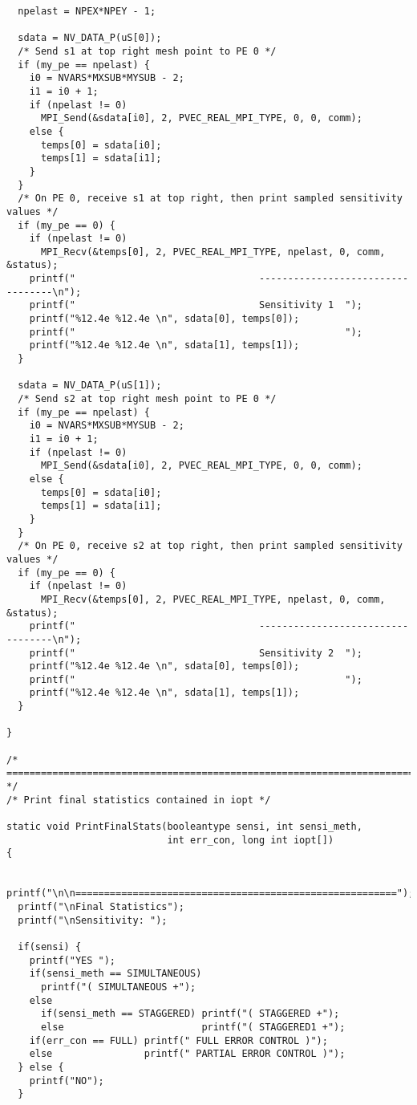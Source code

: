 \begin{verbatim}
  npelast = NPEX*NPEY - 1;

  sdata = NV_DATA_P(uS[0]);
  /* Send s1 at top right mesh point to PE 0 */
  if (my_pe == npelast) {
    i0 = NVARS*MXSUB*MYSUB - 2;
    i1 = i0 + 1;
    if (npelast != 0)
      MPI_Send(&sdata[i0], 2, PVEC_REAL_MPI_TYPE, 0, 0, comm);
    else {
      temps[0] = sdata[i0];
      temps[1] = sdata[i1];
    }
  }
  /* On PE 0, receive s1 at top right, then print sampled sensitivity values */ 
  if (my_pe == 0) {
    if (npelast != 0)
      MPI_Recv(&temps[0], 2, PVEC_REAL_MPI_TYPE, npelast, 0, comm, &status);
    printf("                                ----------------------------------\n");
    printf("                                Sensitivity 1  ");
    printf("%12.4e %12.4e \n", sdata[0], temps[0]); 
    printf("                                               ");
    printf("%12.4e %12.4e \n", sdata[1], temps[1]);
  }

  sdata = NV_DATA_P(uS[1]);
  /* Send s2 at top right mesh point to PE 0 */
  if (my_pe == npelast) {
    i0 = NVARS*MXSUB*MYSUB - 2;
    i1 = i0 + 1;
    if (npelast != 0)
      MPI_Send(&sdata[i0], 2, PVEC_REAL_MPI_TYPE, 0, 0, comm);
    else {
      temps[0] = sdata[i0];
      temps[1] = sdata[i1];
    }
  }
  /* On PE 0, receive s2 at top right, then print sampled sensitivity values */ 
  if (my_pe == 0) {
    if (npelast != 0)
      MPI_Recv(&temps[0], 2, PVEC_REAL_MPI_TYPE, npelast, 0, comm, &status);
    printf("                                ----------------------------------\n");
    printf("                                Sensitivity 2  ");
    printf("%12.4e %12.4e \n", sdata[0], temps[0]); 
    printf("                                               ");
    printf("%12.4e %12.4e \n", sdata[1], temps[1]);
  }

}

/* ======================================================================= */
/* Print final statistics contained in iopt */

static void PrintFinalStats(booleantype sensi, int sensi_meth, 
                            int err_con, long int iopt[])
{

  printf("\n\n========================================================");
  printf("\nFinal Statistics");
  printf("\nSensitivity: ");

  if(sensi) {
    printf("YES ");
    if(sensi_meth == SIMULTANEOUS)   
      printf("( SIMULTANEOUS +");
    else 
      if(sensi_meth == STAGGERED) printf("( STAGGERED +");
      else                        printf("( STAGGERED1 +");                      
    if(err_con == FULL) printf(" FULL ERROR CONTROL )");
    else                printf(" PARTIAL ERROR CONTROL )");
  } else {
    printf("NO");
  }


\end{verbatim}
